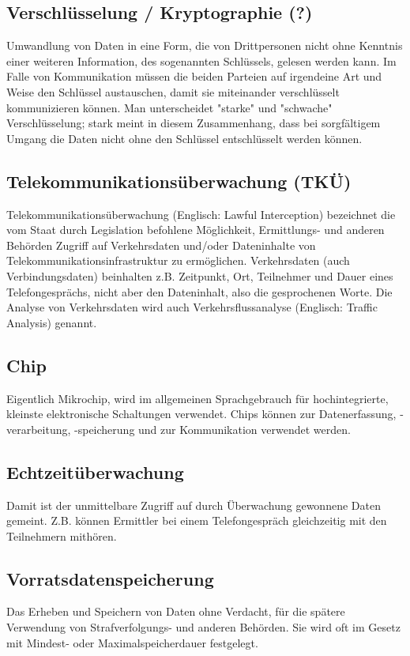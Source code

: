 \subsection*{
Verschl\"usselung / Kryptographie (?) 
}
Umwandlung von Daten in eine Form, die von Drittpersonen nicht ohne 
Kenntnis einer weiteren Information, des sogenannten Schl\"ussels, 
gelesen werden kann. Im Falle von Kommunikation m\"ussen die beiden 
Parteien auf irgendeine Art und Weise den Schl\"ussel austauschen, damit 
sie miteinander verschl\"usselt kommunizieren k\"onnen. Man 
unterscheidet "starke" und "schwache" Verschl\"usselung; stark meint in 
diesem Zusammenhang, dass bei sorgf\"altigem Umgang die Daten nicht ohne 
den Schl\"ussel entschl\"usselt werden k\"onnen. 

\subsection*{
Telekommunikations\"uberwachung (TK\"U) 
}
Telekommunikations\"uberwachung (Englisch: Lawful Interception) 
bezeichnet die vom Staat durch Legislation befohlene M\"oglichkeit, 
Ermittlungs- und anderen Beh\"orden Zugriff auf Verkehrsdaten und/oder 
Dateninhalte von Telekommunikationsinfrastruktur zu erm\"oglichen. 
Verkehrsdaten (auch Verbindungsdaten) beinhalten z.B. Zeitpunkt, Ort, 
Teilnehmer und Dauer eines Telefongespr\"achs, nicht aber den 
Dateninhalt, also die gesprochenen Worte. Die Analyse von Verkehrsdaten 
wird auch Verkehrsflussanalyse (Englisch: Traffic Analysis) genannt. 

\subsection*{
Chip 
}
Eigentlich Mikrochip, wird im allgemeinen Sprachgebrauch f\"ur 
hochintegrierte, kleinste elektronische Schaltungen verwendet. Chips 
k\"onnen zur Datenerfassung, -verarbeitung, -speicherung und zur 
Kommunikation verwendet werden. 

\subsection*{
Echtzeit\"uberwachung 
}
Damit ist der unmittelbare Zugriff auf durch \"Uberwachung gewonnene 
Daten gemeint. Z.B. k\"onnen Ermittler bei einem Telefongespr\"ach 
gleichzeitig mit den Teilnehmern mith\"oren. 

\subsection*{
Vorratsdatenspeicherung 
}
Das Erheben und Speichern von Daten ohne Verdacht, f\"ur die sp\"atere 
Verwendung von Strafverfolgungs- und anderen Beh\"orden. Sie wird oft im 
Gesetz mit Mindest- oder Maximalspeicherdauer festgelegt. 

